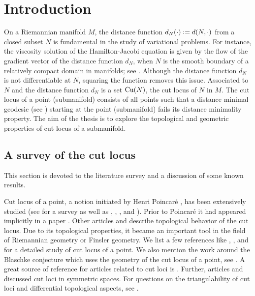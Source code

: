 \chapter{Introduction}\label{ch:introduction}

\hfb On a Riemannian manifold $M$, the distance function $d_N(\cdot) \vcentcolon= d(N,\cdot)$ from a closed subset $N$ is fundamental in the study of variational problems. For instance, the viscosity solution of the Hamilton-Jacobi equation is given by the flow of the gradient vector of the distance function $d_N$, when $N$ is the smooth boundary of a relatively compact domain in manifolds; see  \cite{LiNi05,MaMe03}. Although the distance function $d_N$ is not differentiable at $N$, squaring the function removes this issue. Associated to $N$ and the distance function $d_N$ is a set $\mathrm{Cu}(N)$,\index{\cutn} the cut locus  of $N$ in $M$. The cut locus of a point (submanifold) consists of all points such that a distance minimal geodesic (see ) starting at the point (submanifold) fails its distance minimality property. The aim of the thesis is to explore the topological and geometric properties of cut locus of a submanifold.

\section{A survey of the cut locus}
\hfb This section is devoted to the literature survey and a discussion of some known results.

\vspace{0.2cm}
\hf Cut locus of a point, a notion initiated by Henri Poincar\'{e} \cite{Poin05}, has been extensively studied (see \cite{Kob67} for a survey as well as \cite{Buc77},  \cite{Mye35}, \cite{Sak96}, and \cite{Wol79}). Prior to Poincar\'{e} it had appeared implicitly in a paper \cite{Man81}. Other articles \cite{Whi35} and \cite{Mye35,Mye36} describe topological behavior of the cut locus. Due to its topological properties, it became an important tool in the field of Riemannian geometry or Finsler geometry. We list a few references like \cite{Kli59},  \cite{Rau59}, and \cite[Chapter 5]{ChEb75} for a detailed study of cut locus of a point. We also mention the work around the Blaschke conjecture which uses the geometry of the cut locus of a point, see \cite{Bes78,McK15}. A great source of reference for articles related to cut loci is \cite[\S 4]{Sak84}. Further, articles \cite{Sak77,Sak78,Sak79} and \cite{Tak78,Tak79} discussed cut loci in symmetric spaces. For questions on the triangulability of cut loci and differential topological aspects, see \cite{Buc77,GlSi76,GlSi78,Wall77}.

